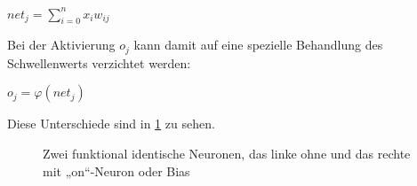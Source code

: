	\centerline {$net_j = \sum_{i=0}^nx_iw_{ij}$}

Bei der Aktivierung $o_j$ kann damit auf eine spezielle Behandlung des Schwellenwerts verzichtet werden:

	\centerline {$o_j = \varphi (net_j)$}

Diese Unterschiede sind in \ref{fig-perceptron} zu sehen.
 
\begin{figure}
	\centering
	\caption[Perceptron]{Zwei funktional identische Neuronen, das linke ohne und das rechte mit „on“-Neuron oder Bias}
	\label{fig-perceptron}

\end{figure}




